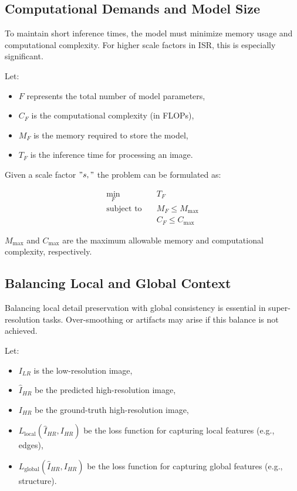 \documentclass[twocolumn]{svjour3}          %
\begin{document}
\subsection{Computational Demands and Model Size}

To maintain short inference times, the model must minimize memory usage and computational complexity. For higher scale factors in ISR, this is especially significant.

Let:
\begin{itemize}
    \item $F$ represents the total number of model parameters,
    \item $C_{F}$ is the computational complexity (in FLOPs),
    \item $M_{F}$ is the memory required to store the model,
    \item $T_{F}$ is the inference time for processing an image.
\end{itemize}

Given a scale factor $"s,"$ the problem can be formulated as:

\begin{align*}
\min_{F} \quad & T_{F} \\
\text{subject to} \quad & M_{F} \leq M_{\text{max}} \\
& C_{F} \leq C_{\text{max}}
\end{align*}

$M_{\text{max}}$ and $C_{\text{max}}$ are the maximum allowable memory and computational complexity, respectively.

\subsection{Balancing Local and Global Context}

Balancing local detail preservation with global consistency is essential in super-resolution tasks. Over-smoothing or artifacts may arise if this balance is not achieved.

Let:
\begin{itemize}
    \item $I_{LR}$ is the low-resolution image,
    \item $\hat{I}_{HR}$ be the predicted high-resolution image,
    \item $I_{HR}$ be the ground-truth high-resolution image,
    \item $L_{\text{local}}(\hat{I}_{HR}, I_{HR})$ be the loss function for capturing local features (e.g., edges),
    \item $L_{\text{global}}(\hat{I}_{HR}, I_{HR})$ be the loss function for capturing global features (e.g., structure).
\end{itemize}
\end{document}

